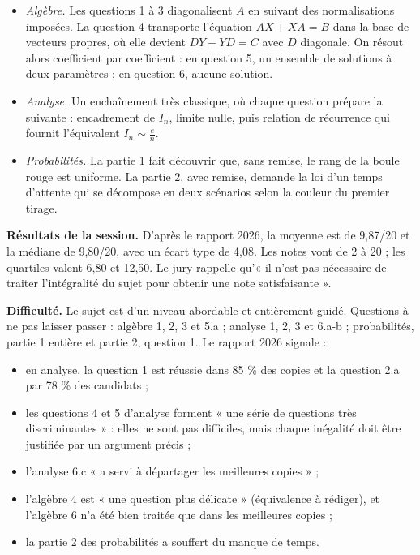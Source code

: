 \documentclass[11pt,a4paper]{article}
\providecommand{\tightlist}{\setlength{\itemsep}{0pt}\setlength{\parskip}{0pt}}
\begin{document}
\begin{itemize}
\tightlist
\item
  \emph{Algèbre.} Les questions 1 à 3 diagonalisent \(A\) en suivant des normalisations imposées. La question 4 transporte l'équation \(AX+XA=B\) dans la base de vecteurs propres, où elle devient \(DY+YD=C\) avec \(D\) diagonale. On résout alors coefficient par coefficient : en question 5, un ensemble de solutions à deux paramètres ; en question 6, aucune solution.
\item
  \emph{Analyse.} Un enchaînement très classique, où chaque question prépare la suivante : encadrement de \(I_n\), limite nulle, puis relation de récurrence qui fournit l'équivalent \(I_n\sim\frac en\).
\item
  \emph{Probabilités.} La partie 1 fait découvrir que, sans remise, le rang de la boule rouge est uniforme. La partie 2, avec remise, demande la loi d'un temps d'attente qui se décompose en deux scénarios selon la couleur du premier tirage.
\end{itemize}

\textbf{Résultats de la session.} D'après le rapport 2026, la moyenne est de 9,87/20 et la médiane de 9,80/20, avec un écart type de 4,08. Les notes vont de 2 à 20 ; les quartiles valent 6,80 et 12,50. Le jury rappelle qu'« il n'est pas nécessaire de traiter l'intégralité du sujet pour obtenir une note satisfaisante ».

\textbf{Difficulté.} Le sujet est d'un niveau abordable et entièrement guidé. Questions à ne pas laisser passer : algèbre 1, 2, 3 et 5.a ; analyse 1, 2, 3 et 6.a-b ; probabilités, partie 1 entière et partie 2, question 1. Le rapport 2026 signale :

\begin{itemize}
\tightlist
\item
  en analyse, la question 1 est réussie dans 85 \% des copies et la question 2.a par 78 \% des candidats ;
\item
  les questions 4 et 5 d'analyse forment « une série de questions très discriminantes » : elles ne sont pas difficiles, mais chaque inégalité doit être justifiée par un argument précis ;
\item
  l'analyse 6.c « a servi à départager les meilleures copies » ;
\item
  l'algèbre 4 est « une question plus délicate » (équivalence à rédiger), et l'algèbre 6 n'a été bien traitée que dans les meilleures copies ;
\item
  la partie 2 des probabilités a souffert du manque de temps.
\end{itemize}
\end{document}
